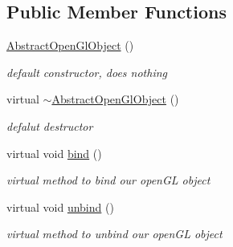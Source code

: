 \subsection*{Public Member Functions}
\begin{DoxyCompactItemize}
\item 
\hypertarget{class_abstract_open_gl_object_a96af8fad4e89a9ea75c535748ffa82a5}{\hyperlink{class_abstract_open_gl_object_a96af8fad4e89a9ea75c535748ffa82a5}{Abstract\-Open\-Gl\-Object} ()}\label{class_abstract_open_gl_object_a96af8fad4e89a9ea75c535748ffa82a5}

\begin{DoxyCompactList}\small\item\em default constructor, does nothing \end{DoxyCompactList}\item 
\hypertarget{class_abstract_open_gl_object_ac48ade8b59e497ef45e9238327f93873}{virtual \hyperlink{class_abstract_open_gl_object_ac48ade8b59e497ef45e9238327f93873}{$\sim$\-Abstract\-Open\-Gl\-Object} ()}\label{class_abstract_open_gl_object_ac48ade8b59e497ef45e9238327f93873}

\begin{DoxyCompactList}\small\item\em defalut destructor \end{DoxyCompactList}\item 
\hypertarget{class_abstract_open_gl_object_ad177ced7b2eee2b6d80faa8f5409517b}{virtual void \hyperlink{class_abstract_open_gl_object_ad177ced7b2eee2b6d80faa8f5409517b}{bind} ()}\label{class_abstract_open_gl_object_ad177ced7b2eee2b6d80faa8f5409517b}

\begin{DoxyCompactList}\small\item\em virtual method to bind our open\-G\-L object \end{DoxyCompactList}\item 
\hypertarget{class_abstract_open_gl_object_aa345bb3bc9d0e27521462fd3cfa93a69}{virtual void \hyperlink{class_abstract_open_gl_object_aa345bb3bc9d0e27521462fd3cfa93a69}{unbind} ()}\label{class_abstract_open_gl_object_aa345bb3bc9d0e27521462fd3cfa93a69}

\begin{DoxyCompactList}\small\item\em virtual method to unbind our open\-G\-L object \end{DoxyCompactList}\end{DoxyCompactItemize}
